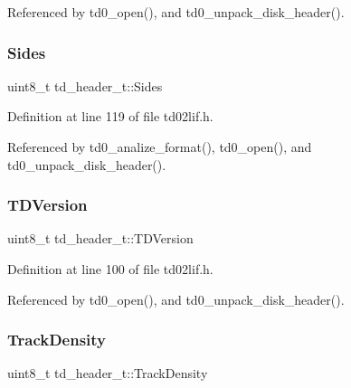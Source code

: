 Referenced by td0\+\_\+open(), and td0\+\_\+unpack\+\_\+disk\+\_\+header().

\mbox{\label{structtd__header__t_a8b188d880b5d9d94122674265b0ca3e6}} 
\subsubsection{\texorpdfstring{Sides}{Sides}}
{\footnotesize\ttfamily uint8\+\_\+t td\+\_\+header\+\_\+t\+::\+Sides}



Definition at line 119 of file td02lif.\+h.



Referenced by td0\+\_\+analize\+\_\+format(), td0\+\_\+open(), and td0\+\_\+unpack\+\_\+disk\+\_\+header().

\mbox{\label{structtd__header__t_ac63e3625279d7262e3d094c0c5e5753a}} 
\subsubsection{\texorpdfstring{T\+D\+Version}{TDVersion}}
{\footnotesize\ttfamily uint8\+\_\+t td\+\_\+header\+\_\+t\+::\+T\+D\+Version}



Definition at line 100 of file td02lif.\+h.



Referenced by td0\+\_\+open(), and td0\+\_\+unpack\+\_\+disk\+\_\+header().

\mbox{\label{structtd__header__t_a2d1461bb956665d519d33fca629477ab}} 
\subsubsection{\texorpdfstring{Track\+Density}{TrackDensity}}
{\footnotesize\ttfamily uint8\+\_\+t td\+\_\+header\+\_\+t\+::\+Track\+Density}



